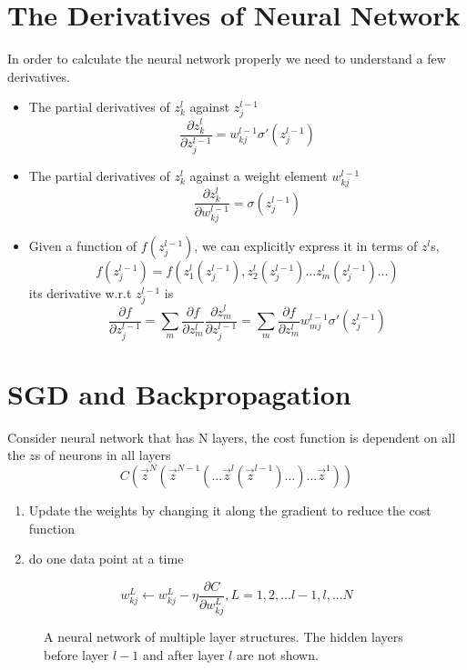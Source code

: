\documentclass[12pt, oneside]{article}
\begin{document}
\section{The Derivatives of Neural Network}
In order to calculate the neural network properly we need to understand a few derivatives.

\begin{itemize}
\item The partial derivatives of $z^{l}_k$ against $z^{l-1}_j$
\begin{equation}
\frac{\partial z^{l}_k}{\partial z_j^{l-1}}=w^{l-1}_{kj}\sigma'(z^{l-1}_j)
\end{equation}

\item The partial derivatives of $z^{l}_k$ against a weight element $w_{kj}^{l-1}$
\begin{equation}
\frac{\partial z^{l}_k}{\partial w_{kj}^{l-1}}=\sigma(z^{l-1}_j)
\end{equation}

\item Given a function of $f(z^{l-1}_j)$, we can explicitly express it in terms of $z^{l}$s,
$$
f(z^{l-1}_j)=f(z^l_1(z^{l-1}_j), z^l_2(z^{l-1}_j)...z^l_m(z^{l-1}_j)...)
$$
its derivative w.r.t $z^{l-1}_j$ is
\begin{equation}
\frac{\partial f}{\partial z^{l-1}_j}=\sum\limits_m \frac{\partial f}{\partial z^{l}_m}\frac{\partial z^l_m}{\partial z^{l-1}_j}=\sum\limits_m \frac{\partial f}{\partial z^{l}_m}w^{l-1}_{mj}\sigma'(z^{l-1}_j)
\end{equation}

\end{itemize}



\section{SGD and Backpropagation}
Consider neural network that has N layers, the cost function is dependent on all the $z$s of neurons in all layers
\begin{equation}
C\left(\vec{z}^N(\vec{z}^{N-1}(...\vec{z}^{l}(\vec{z}^{l-1})...) ...\vec{z}^1)\right)
\end{equation}

\begin{enumerate}
\item Update the weights by changing it along the gradient to reduce the cost function
\item do one data point at a time
\end{enumerate}
\begin{equation}
{w_{kj}^L \leftarrow w_{kj}^L-\eta \frac{\partial C}{\partial w_{kj}^L}}, L=1, 2, ...l-1, l, ...N
\end{equation}
\begin{figure}

\caption{A neural network of multiple layer structures. The hidden layers before layer $l-1$ and after layer $l$ are not shown. }
\end{figure}
\end{document}

